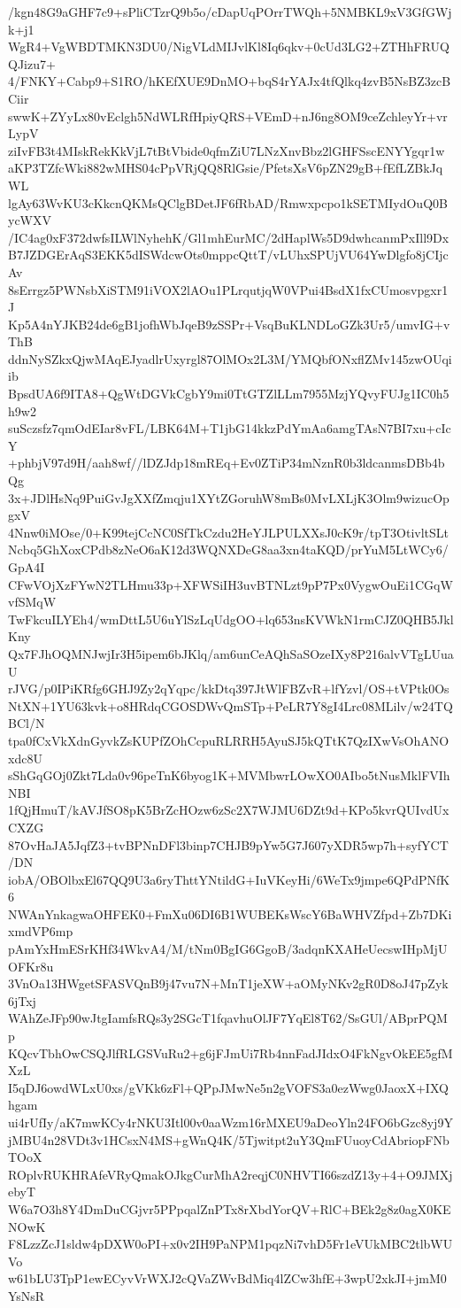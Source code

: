 /kgn48G9aGHF7c9+sPliCTzrQ9b5o/cDapUqPOrrTWQh+5NMBKL9xV3GfGWjk+j1
WgR4+VgWBDTMKN3DU0/NigVLdMIJvlKl8Iq6qkv+0cUd3LG2+ZTHhFRUQQJizu7+
4/FNKY+Cabp9+S1RO/hKEfXUE9DnMO+bqS4rYAJx4tfQlkq4zvB5NsBZ3zcBCiir
swwK+ZYyLx80vEclgh5NdWLRfHpiyQRS+VEmD+nJ6ng8OM9ceZchleyYr+vrLypV
ziIvFB3t4MIskRekKkVjL7tBtVbide0qfmZiU7LNzXnvBbz2lGHFSscENYYgqr1w
aKP3TZfcWki882wMHS04cPpVRjQQ8RlGsie/PfetsXsV6pZN29gB+fEfLZBkJqWL
lgAy63WvKU3cKkcnQKMsQClgBDetJF6fRbAD/Rmwxpcpo1kSETMIydOuQ0BycWXV
/IC4ag0xF372dwfsILWlNyhehK/Gl1mhEurMC/2dHaplWs5D9dwhcanmPxIll9Dx
B7JZDGErAqS3EKK5dISWdcwOts0mppcQttT/vLUhxSPUjVU64YwDlgfo8jCIjcAv
8sErrgz5PWNsbXiSTM91iVOX2lAOu1PLrqutjqW0VPui4BsdX1fxCUmosvpgxr1J
Kp5A4nYJKB24de6gB1jofhWbJqeB9zSSPr+VsqBuKLNDLoGZk3Ur5/umvIG+vThB
ddnNySZkxQjwMAqEJyadlrUxyrgl87OlMOx2L3M/YMQbfONxflZMv145zwOUqiib
BpsdUA6f9ITA8+QgWtDGVkCgbY9mi0TtGTZlLLm7955MzjYQvyFUJg1IC0h5h9w2
suSczsfz7qmOdEIar8vFL/LBK64M+T1jbG14kkzPdYmAa6amgTAsN7BI7xu+cIcY
+phbjV97d9H/aah8wf//lDZJdp18mREq+Ev0ZTiP34mNznR0b3ldcanmsDBb4bQg
3x+JDlHsNq9PuiGvJgXXfZmqju1XYtZGoruhW8mBs0MvLXLjK3Olm9wizucOpgxV
4Nnw0iMOse/0+K99tejCcNC0SfTkCzdu2HeYJLPULXXsJ0cK9r/tpT3OtivltSLt
Ncbq5GhXoxCPdb8zNeO6aK12d3WQNXDeG8aa3xn4taKQD/prYuM5LtWCy6/GpA4I
CFwVOjXzFYwN2TLHmu33p+XFWSiIH3uvBTNLzt9pP7Px0VygwOuEi1CGqWvfSMqW
TwFkcuILYEh4/wmDttL5U6uYlSzLqUdgOO+lq653nsKVWkN1rmCJZ0QHB5JklKny
Qx7FJhOQMNJwjIr3H5ipem6bJKlq/am6unCeAQhSaSOzeIXy8P216alvVTgLUuaU
rJVG/p0IPiKRfg6GHJ9Zy2qYqpc/kkDtq397JtWlFBZvR+lfYzvl/OS+tVPtk0Os
NtXN+1YU63kvk+o8HRdqCGOSDWvQmSTp+PeLR7Y8gI4Lrc08MLilv/w24TQBCl/N
tpa0fCxVkXdnGyvkZsKUPfZOhCcpuRLRRH5AyuSJ5kQTtK7QzIXwVsOhANOxdc8U
sShGqGOj0Zkt7Lda0v96peTnK6byog1K+MVMbwrLOwXO0AIbo5tNusMklFVIhNBI
1fQjHmuT/kAVJfSO8pK5BrZcHOzw6zSc2X7WJMU6DZt9d+KPo5kvrQUIvdUxCXZG
87OvHaJA5JqfZ3+tvBPNnDFl3binp7CHJB9pYw5G7J607yXDR5wp7h+syfYCT/DN
iobA/OBOlbxEl67QQ9U3a6ryThttYNtildG+IuVKeyHi/6WeTx9jmpe6QPdPNfK6
NWAnYnkagwaOHFEK0+FmXu06DI6B1WUBEKsWscY6BaWHVZfpd+Zb7DKixmdVP6mp
pAmYxHmESrKHf34WkvA4/M/tNm0BgIG6GgoB/3adqnKXAHeUecswIHpMjUOFKr8u
3VnOa13HWgetSFASVQnB9j47vu7N+MnT1jeXW+aOMyNKv2gR0D8oJ47pZyk6jTxj
WAhZeJFp90wJtgIamfsRQs3y2SGcT1fqavhuOlJF7YqEl8T62/SsGUl/ABprPQMp
KQcvTbhOwCSQJlfRLGSVuRu2+g6jFJmUi7Rb4nnFadJIdxO4FkNgvOkEE5gfMXzL
I5qDJ6owdWLxU0xs/gVKk6zFl+QPpJMwNe5n2gVOFS3a0ezWwg0JaoxX+IXQhgam
ui4rUfIy/aK7mwKCy4rNKU3Itl00v0aaWzm16rMXEU9aDeoYln24FO6bGzc8yj9Y
jMBU4n28VDt3v1HCsxN4MS+gWnQ4K/5Tjwitpt2uY3QmFUuoyCdAbriopFNbTOoX
ROplvRUKHRAfeVRyQmakOJkgCurMhA2reqjC0NHVTI66szdZ13y+4+O9JMXjebyT
W6a7O3h8Y4DmDuCGjvr5PPpqalZnPTx8rXbdYorQV+RlC+BEk2g8z0agX0KENOwK
F8LzzZcJ1sldw4pDXW0oPI+x0v2IH9PaNPM1pqzNi7vhD5Fr1eVUkMBC2tlbWUVo
w61bLU3TpP1ewECyvVrWXJ2cQVaZWvBdMiq4lZCw3hfE+3wpU2xkJI+jmM0YsNsR
